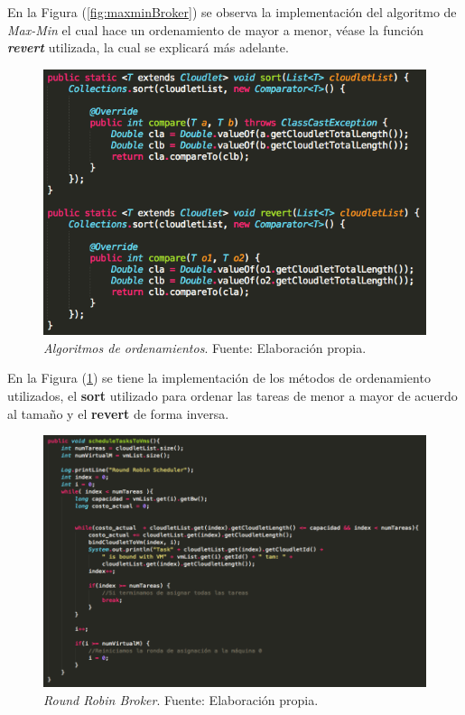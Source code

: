 En la Figura (\ref{fig:maxminBroker}) se observa la implementaci\'on del algoritmo de \textit{Max-Min} el cual hace un ordenamiento de mayor a menor, v\'ease la funci\'on \textbf{\textit{revert}} utilizada, la cual se explicar\'a m\'as adelante.

\newpage


\renewcommand\thefigure{\arabic{figure}}
\begin{figure}[h!]
	\centering
	\includegraphics[scale=0.5]{media/ordenamientos}
	\caption{\textit{Algoritmos de ordenamientos}. Fuente: Elaboración propia.}
	\label{fig:sortRevert}
\end{figure}

En la Figura (\ref{fig:sortRevert}) se tiene la implementaci\'on de los m\'etodos de ordenamiento utilizados, el \textbf{sort} utilizado para ordenar las tareas de menor a mayor de acuerdo al tamaño y el \textbf{revert} de forma inversa.

\newpage
\renewcommand\thefigure{\arabic{figure}}
\begin{figure}[h!]
	\centering
	\includegraphics[scale=0.4]{media/RRBroker}
	\caption{\textit{Round Robin Broker}. Fuente: Elaboración propia.}
	\label{fig:RRBroker}
\end{figure}

